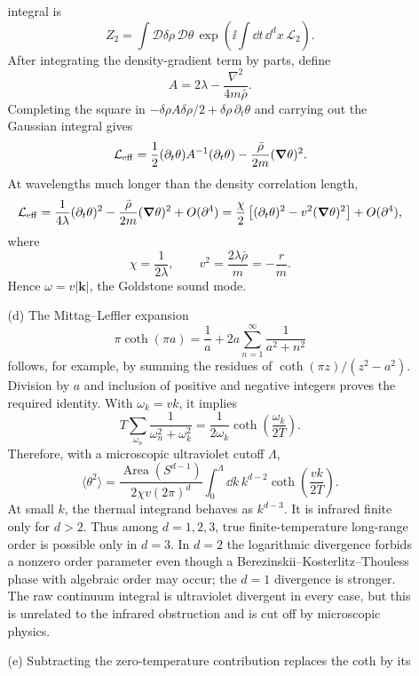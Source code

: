 \begin{enumerate}
\begin{enumerate}
    integral is
    \[
      Z_2=\int\mathcal D\delta\rho\,\mathcal D\theta\,
        \exp\!\left(\ii\int \dd t\,\dd^dx\,\mathcal L_2\right).
    \]
    After integrating the density-gradient term by parts, define
    \[
      A=2\lambda-\frac{\nabla^2}{4m\bar\rho}.
    \]
    Completing the square in
    \(-\delta\rho A\delta\rho/2+\delta\rho\,\partial_t\theta\) and carrying
    out the Gaussian integral gives
    \[
      \mathcal L_{\rm eff}
        =\frac12(\partial_t\theta)A^{-1}(\partial_t\theta)
         -\frac{\bar\rho}{2m}(\boldsymbol\nabla\theta)^2.
    \]
    At wavelengths much longer than the density correlation length,
    \[
      \mathcal L_{\rm eff}
        =\frac1{4\lambda}(\partial_t\theta)^2
         -\frac{\bar\rho}{2m}(\boldsymbol\nabla\theta)^2
         +O(\partial^4)
        =\frac\chi2\left[(\partial_t\theta)^2
          -v^2(\boldsymbol\nabla\theta)^2\right]+O(\partial^4),
    \]
    where
    \[
      \chi=\frac1{2\lambda},
      \qquad
      v^2=\frac{2\lambda\bar\rho}{m}=-\frac rm.
    \]
    Hence \(\omega=v|\mathbf k|\), the Goldstone sound mode.
    \item[(d)]
    The Mittag--Leffler expansion
    \[
      \pi\coth(\pi a)=\frac1a
        +2a\sum_{n=1}^{\infty}\frac1{a^2+n^2}
    \]
    follows, for example, by summing the residues of
    \(\coth(\pi z)/(z^2-a^2)\).  Division by \(a\) and inclusion of positive
    and negative integers proves the required identity.  With
    \(\omega_k=v k\), it implies
    \[
      T\sum_{\omega_n}\frac1{\omega_n^2+\omega_k^2}
        =\frac1{2\omega_k}\coth\!\left(\frac{\omega_k}{2T}\right).
    \]
    Therefore, with a microscopic ultraviolet cutoff \(\Lambda\),
    \[
      \langle\theta^2\rangle
        =\frac{\operatorname{Area}(S^{d-1})}
          {2\chi v(2\pi)^d}
          \int_0^\Lambda \dd k\,k^{d-2}
            \coth\!\left(\frac{vk}{2T}\right).
    \]
    At small \(k\), the thermal integrand behaves as \(k^{d-3}\).  It is
    infrared finite only for \(d>2\).  Thus among \(d=1,2,3\), true
    finite-temperature long-range order is possible only in \(d=3\).
    In \(d=2\) the logarithmic divergence forbids a nonzero order parameter
    even though a Berezinskii--Kosterlitz--Thouless phase with algebraic order
    may occur; the \(d=1\) divergence is stronger.  The raw continuum
    integral is ultraviolet divergent in every case, but this is unrelated
    to the infrared obstruction and is cut off by microscopic physics.
    \item[(e)]
    Subtracting the zero-temperature contribution replaces the coth by its

\end{enumerate}
\end{enumerate}
